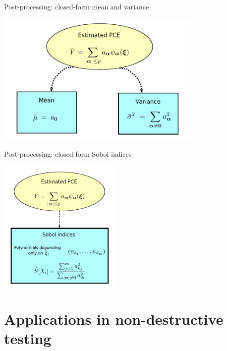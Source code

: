 \documentclass[9pt]{beamer}
\begin{document}
\begin{frame}{Post-processing: closed-form mean and variance}

\begin{center}
 \includegraphics[width=10cm]{../Pics/chaos_4.jpg} 
\end{center}

\end{frame}

\begin{frame}{Post-processing: closed-form Sobol indices}

\begin{center}
 \includegraphics[height=6.5cm]{../Pics/chaos_5.jpg} \\
 \color{cornellred}{Interaction indices can also be derived!}
\end{center}

\end{frame}

\section{Applications in non-destructive testing}
\end{document}
